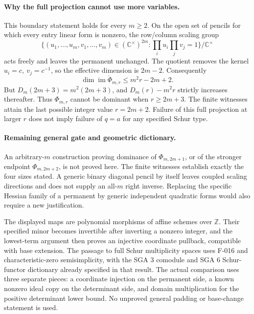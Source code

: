 \paragraph{Why the full projection cannot use more variables.}
This boundary statement holds for every \(m\geq2\).
On the open set of pencils for which every entry linear form
is nonzero, the row/column scaling group
\[
 \{(u_1,\ldots,u_m,v_1,\ldots,v_m)\in(\mathbb C^\times)^{2m}:
                        \prod_i u_i\prod_j v_j=1\}/\mathbb C^\times
\]
acts freely and leaves the permanent unchanged. The quotient
removes the kernel \(u_i=c,\ v_j=c^{-1}\), so the effective
dimension is \(2m-2\). Consequently
\[
             \dim\overline{\operatorname{im}\Phi_{m,r}}
                         \leq m^2r-2m+2.                       \tag{A-031.13}
\]
But \(D_m(2m+3)=m^2(2m+3)\), and
\(D_m(r)-m^2r\) strictly increases thereafter.
Thus \(\Phi_{m,r}\) cannot be dominant when \(r\geq2m+3\).
The finite witnesses attain the last possible integer value
\(r=2m+2\). Failure of this full projection at larger \(r\)
does not imply failure of \(q=a\) for any specified Schur type.

\paragraph{Remaining general gate and geometric dictionary.}
An arbitrary-\(m\) construction proving dominance of
\(\Phi_{m,2m+1}\), or of the stronger endpoint
\(\Phi_{m,2m+2}\), is not proved here. The finite witnesses
establish exactly the four sizes stated. A generic binary
diagonal pencil by itself leaves coupled scaling directions
and does not supply an all-\(m\) right inverse. Replacing the
specific Hessian family of a permanent by generic independent
quadratic forms would also require a new justification.

The displayed maps are polynomial morphisms of affine schemes
over \(\mathbb Z\). Their specified minor becomes invertible
after inverting a nonzero integer, and the lowest-term argument
then proves an injective coordinate pullback, compatible with
base extension. The passage to full Schur multiplicity spaces
uses F-016 and characteristic-zero semisimplicity, with the
SGA 3 comodule and SGA 6 Schur-functor dictionary already
specified in that result. The actual comparison uses three
separate pieces: a coordinate injection on the permanent side,
a known nonzero ideal copy on the determinant side, and
domain multiplication for the positive determinant lower bound.
No unproved general padding or base-change statement is used.
